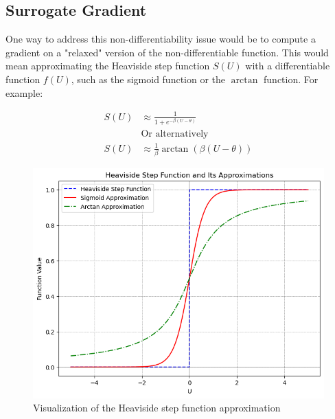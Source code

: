 \documentclass[11pt]{article}
\begin{document}
\subsection{Surrogate Gradient}

One way to address this non-differentiability issue would be to compute a gradient on a "relaxed" version of the non-differentiable function. This would mean approximating the Heaviside step function $S(U)$ with a differentiable function $f(U)$, such as the sigmoid function or the $\arctan$ function. For example:

\begin{figure}[ht]
  \begin{minipage}[t]{0.5\textwidth}
    \vspace{40pt} %
    $$\begin{aligned}
        S(U) & \approx \frac{1}{1 + e^{-\beta(U - \theta)}}       \\
             & \text{Or alternatively}                            \\
        S(U) & \approx \frac{1}{\beta} \arctan(\beta(U - \theta))
      \end{aligned}$$
  \end{minipage}
  \hfill
  \begin{minipage}[t]{0.45\textwidth}
    \vspace{0pt} %
    \centering
    \includegraphics[width=\textwidth]{./image/approx_surrogate.png}
    \caption{Visualization of the Heaviside step function approximation}
  \end{minipage}
\end{figure}
\end{document}
